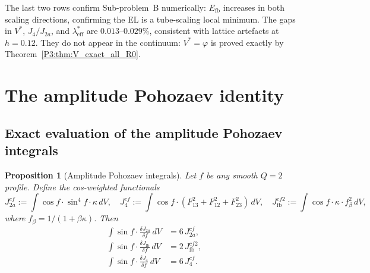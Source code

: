 \documentclass[11pt,a4paper]{article}
\newtheorem{proposition}[theorem]{Proposition}
\theoremstyle{definition}
\theoremstyle{remark}
\newcommand{\vp}{\varphi}
\newcommand{\leff}{\lambda_{\mathrm{eff}}}
\newcommand{\kk}{\kappa}
\begin{document}
The last two rows confirm Sub-problem~B numerically: $E_{\mathrm{fb}}$
increases in both scaling directions, confirming the EL is a
tube-scaling local minimum.  The gaps in $V^*$, $J_4/J_{2a}$, and $\leff^*$
are $0.013$--$0.029\%$, consistent with lattice artefacts at $h=0.12$.
They do not appear in the continuum: $V^*=\vp$ is proved exactly
by Theorem~\ref{P3:thm:V_exact_all_R0}.



\section{The amplitude Pohozaev identity}
\label{P3:sec:pohozaev_a}

\subsection{Exact evaluation of the amplitude Pohozaev integrals}

\begin{proposition}[Amplitude Pohozaev integrals]
\label{P3:prop:pohozaev_a}
Let $f$ be any smooth $Q=2$ profile.  Define the cos-weighted functionals
\begin{equation}
  J_{2a}^{cf} := \int \cos f\cdot\sin^4\!f\cdot\kk\,dV,\quad
  J_4^{cf}    := \int \cos f\cdot (F_{13}^2+F_{12}^2+F_{23}^2)\,dV,\quad
  J_{\mathrm{fb}}^{cf2} := \int \cos f\cdot \kk\cdot f_\beta^2\,dV,
\end{equation}
where $f_\beta = 1/(1+\beta\kk)$.  Then
\begin{align}
  \int \sin f\cdot\frac{\delta J_{2a}}{\delta f}\,dV
    &= 6\,J_{2a}^{cf},      \label{P3:eq:poh_J2a}\\
  \int \sin f\cdot\frac{\delta J_{\mathrm{fb}}}{\delta f}\,dV
    &= 2\,J_{\mathrm{fb}}^{cf2}, \label{P3:eq:poh_Jfb}\\
  \int \sin f\cdot\frac{\delta J_4}{\delta f}\,dV
    &= 6\,J_4^{cf}.          \label{P3:eq:poh_J4}
\end{align}
\end{proposition}
\end{document}
